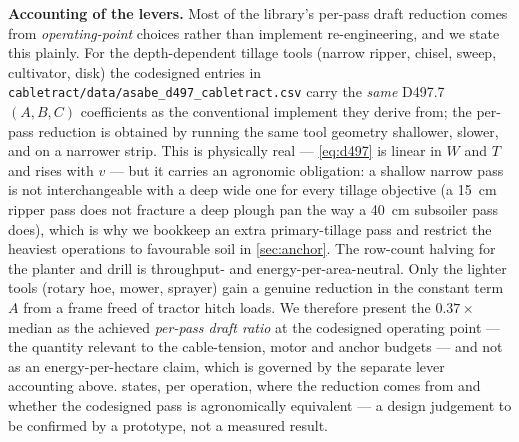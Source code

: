 \documentclass[11pt,a4paper]{article}
\begin{document}
\textbf{Accounting of the levers.} Most of the library's per-pass draft reduction comes from \emph{operating-point} choices rather than implement re-engineering, and we state this plainly. For the depth-dependent tillage tools (narrow ripper, chisel, sweep, cultivator, disk) the codesigned entries in \texttt{cabletract/data/asabe\_d497\_cabletract.csv} carry the \emph{same} D497.7 $(A,B,C)$ coefficients as the conventional implement they derive from; the per-pass reduction is obtained by running the same tool geometry shallower, slower, and on a narrower strip. This is physically real --- \cref{eq:d497} is linear in $W$ and $T$ and rises with $v$ --- but it carries an agronomic obligation: a shallow narrow pass is not interchangeable with a deep wide one for every tillage objective (a \SI{15}{\centi\meter} ripper pass does not fracture a deep plough pan the way a \SI{40}{\centi\meter} subsoiler pass does), which is why we bookkeep an extra primary-tillage pass and restrict the heaviest operations to favourable soil in \cref{sec:anchor}. The row-count halving for the planter and drill is throughput- and energy-per-area-neutral. Only the lighter tools (rotary hoe, mower, sprayer) gain a genuine reduction in the constant term $A$ from a frame freed of tractor hitch loads. We therefore present the $0.37\times$ median as the achieved \emph{per-pass draft ratio} at the codesigned operating point --- the quantity relevant to the cable-tension, motor and anchor budgets --- and not as an energy-per-hectare claim, which is governed by the separate lever accounting above.  states, per operation, where the reduction comes from and whether the codesigned pass is agronomically equivalent --- a design judgement to be confirmed by a prototype, not a measured result.
\end{document}

